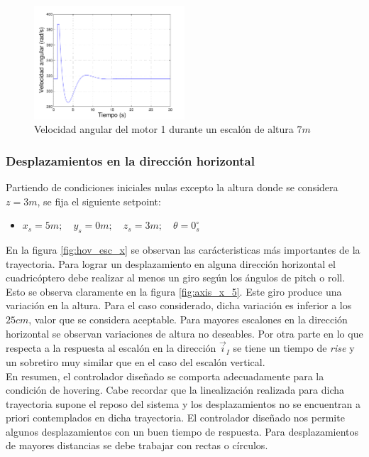 \documentclass[main]{subfiles}
\begin{document}
\begin{figure}[h!]
  \centering
	\includegraphics[width=0.5\textwidth]{./pics_sim_control/hov/w_z_7.pdf}
  \caption{Velocidad angular del motor 1 durante un escal\'on de altura $7m$}
  \label{fig:w_z_7}
\end{figure}


\subsubsection{Desplazamientos en la direcci\'on horizontal}
Partiendo de condiciones iniciales nulas excepto la altura donde se considera $z = 3 m$, se fija el siguiente setpoint:
\begin{itemize}
\item ${x_s = 5 m;\quad y_s = 0 m;\quad z_s = 3 m;\quad \theta = 0_s^\circ}$
\end{itemize}

En la figura \ref{fig:hov_esc_x} se observan las car\'acteristicas m\'as importantes de la trayectoria. Para lograr un desplazamiento en alguna direcci\'on horizontal el cuadric\'optero debe realizar al menos un giro seg\'un los \'angulos de pitch o roll. Esto se observa claramente en la figura \ref{fig:axis_x_5}. Este giro produce una variaci\'on en la altura. Para el caso considerado, dicha variaci\'on es inferior a los $25cm$, valor que se considera aceptable. Para mayores escalones en la direcci\'on horizontal se observan variaciones de altura no deseables. Por otra parte en lo que respecta a la respuesta al escal\'on en la direcci\'on $\vec{i}_I$ se tiene un tiempo de \emph{rise} y un sobretiro muy similar que en el caso del escal\'on vertical.\\

En resumen, el controlador diseñado se comporta adecuadamente para la condici\'on de hovering. Cabe recordar que la linealizaci\'on realizada para dicha trayectoria supone el reposo del sistema y los desplazamientos no se encuentran a priori contemplados en dicha trayectoria. El controlador diseñado nos permite algunos desplazamientos con un buen tiempo de respuesta. Para desplazamientos de mayores distancias se debe trabajar con rectas o c\'irculos. 
\end{document}
